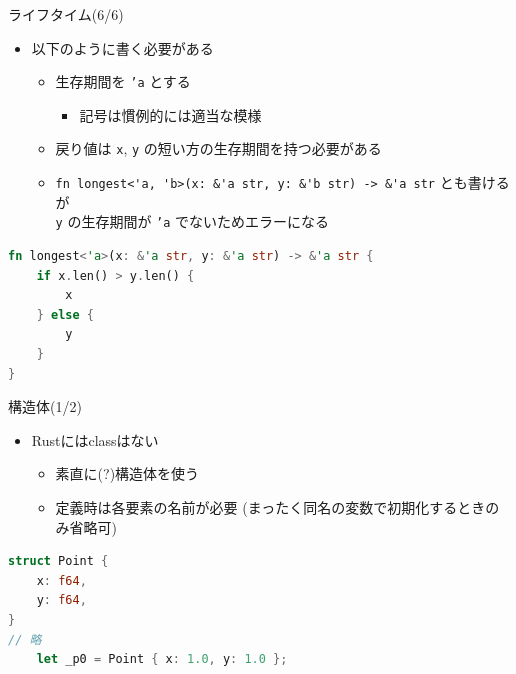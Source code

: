 \documentclass[cjk,dvipdfmx,10pt,compress,fragile%
hyperref={bookmarks=true,bookmarksnumbered=true,bookmarksopen=false,%
colorlinks=false,%
pdftitle={第 134 回 関西 Debian 勉強会},%
pdfauthor={小林},%
pdfsubject={資料},%
}]{beamer}
\begin{document}
\begin{frame}[t,fragile]{ライフタイム(6/6)}
\begin{itemize}
 \item 以下のように書く必要がある
       \begin{itemize}
	\item 生存期間を \texttt{'a} とする
	      \begin{itemize}
	       \item 記号は慣例的には適当な模様
	      \end{itemize}
	\item 戻り値は \texttt{x}, \texttt{y} の短い方の生存期間を持つ必要がある
	\item \verb|fn longest<'a, 'b>(x: &'a str, y: &'b str) -> &'a str| とも書けるが\\
	      \texttt{y} の生存期間が \texttt{'a} でないためエラーになる
       \end{itemize}
\end{itemize}
\begin{lstlisting}[language=Rust,style=boxed,style=colouredRust,basicstyle=\small\tt,lineskip=-2pt]
fn longest<'a>(x: &'a str, y: &'a str) -> &'a str {
    if x.len() > y.len() {
        x
    } else {
        y
    }
}\end{lstlisting}
\end{frame}

\begin{frame}[t,fragile]{構造体(1/2)}
\begin{itemize}
 \item Rustにはclassはない
       \begin{itemize}
	\item 素直に(?)構造体を使う
	\item 定義時は各要素の名前が必要 (まったく同名の変数で初期化するときのみ省略可)
       \end{itemize}
\end{itemize}
\begin{lstlisting}[language=Rust,style=boxed,style=colouredRust,basicstyle=\small\tt,lineskip=-2pt]
struct Point {
    x: f64,
    y: f64,
}
// 略
    let _p0 = Point { x: 1.0, y: 1.0 };
\end{lstlisting}
\end{frame}
\end{document}
